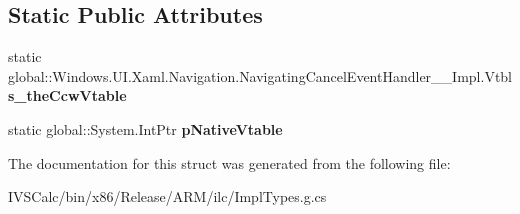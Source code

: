 \subsection*{Static Public Attributes}
\begin{DoxyCompactItemize}
\item 
\mbox{\label{struct_windows_1_1_u_i_1_1_xaml_1_1_navigation_1_1_navigating_cancel_event_handler_____impl_1_1_vtbl_a59ed05d9c30a0b1d52384caecce16df7}} 
static global\+::\+Windows.\+U\+I.\+Xaml.\+Navigation.\+Navigating\+Cancel\+Event\+Handler\+\_\+\+\_\+\+Impl.\+Vtbl {\bfseries s\+\_\+the\+Ccw\+Vtable}
\item 
\mbox{\label{struct_windows_1_1_u_i_1_1_xaml_1_1_navigation_1_1_navigating_cancel_event_handler_____impl_1_1_vtbl_a219bb935d0409ebc5cef96ed2ff1452a}} 
static global\+::\+System.\+Int\+Ptr {\bfseries p\+Native\+Vtable}
\end{DoxyCompactItemize}


The documentation for this struct was generated from the following file\+:\begin{DoxyCompactItemize}
\item 
I\+V\+S\+Calc/bin/x86/\+Release/\+A\+R\+M/ilc/Impl\+Types.\+g.\+cs\end{DoxyCompactItemize}
